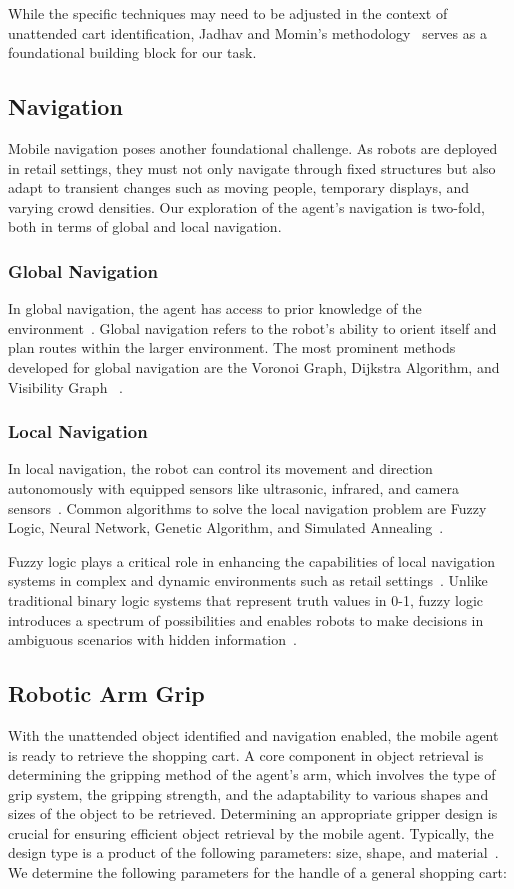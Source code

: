 \documentclass[10pt,twocolumn,letterpaper]{article}
\begin{document}
While the specific techniques may need to be adjusted in the context of unattended cart identification, Jadhav and Momin's methodology~\cite{detection-identifcation} serves as a foundational building block for our task.

\subsection{Navigation}
Mobile navigation poses another foundational challenge. As robots are deployed in retail settings, they must not only navigate through fixed structures but also adapt to transient changes such as moving people, temporary displays, and varying crowd densities. Our exploration of the agent's navigation is two-fold, both in terms of global and local navigation.

\subsubsection{Global Navigation}
In global navigation, the agent has access to prior knowledge of the environment~\cite{mobile-robot-navigation}. Global navigation refers to the robot's ability to orient itself and plan routes within the larger environment. The most prominent methods developed for global navigation are the Voronoi Graph, Dijkstra Algorithm, and Visibility Graph ~\cite{mobile-robot-navigation}.

\subsubsection{Local Navigation}
In local navigation, the robot can control its movement and direction autonomously with equipped sensors like ultrasonic, infrared, and camera sensors~\cite{mobile-robot-navigation}. Common algorithms to solve the local navigation problem are Fuzzy Logic, Neural Network, Genetic Algorithm, and Simulated Annealing~\cite{mobile-robot-navigation}.

Fuzzy logic plays a critical role in enhancing the capabilities of local navigation systems in complex and dynamic environments such as retail settings~\cite{intro-fuzzy}. Unlike traditional binary logic systems that represent truth values in 0-1, fuzzy logic introduces a spectrum of possibilities and enables robots to make decisions in ambiguous scenarios with hidden information~\cite{intro-fuzzy}.

\subsection{Robotic Arm Grip}
With the unattended object identified and navigation enabled, the mobile agent is ready to retrieve the shopping cart. A core component in object retrieval is determining the gripping method of the agent's arm, which involves the type of grip system, the gripping strength, and the adaptability to various shapes and sizes of the object to be retrieved.
Determining an appropriate gripper design is crucial for ensuring efficient object retrieval by the mobile agent. Typically, the design type is a product of the following parameters: size, shape, and material~\cite{robotic-arm}. We determine the following parameters for the handle of a general shopping cart:
\end{document}
